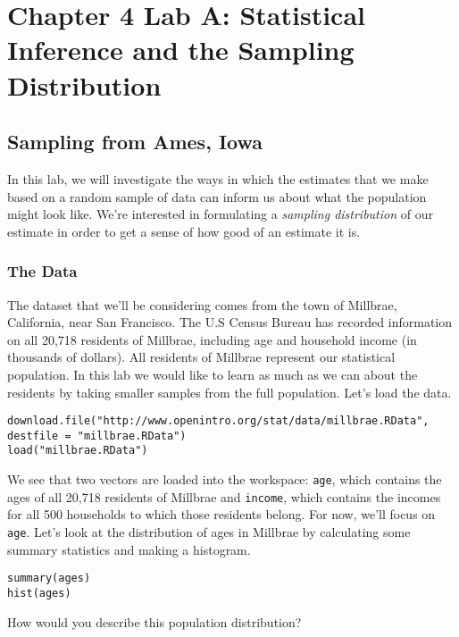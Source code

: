 \documentclass[11pt]{article}
\begin{document}
\section*{Chapter 4 Lab A: Statistical Inference and the Sampling Distribution}
\subsection*{Sampling from Ames, Iowa}

In this lab, we will investigate the ways in which the estimates that we make based on a random sample of data can inform us about what the population might look like.  We're interested in formulating a \emph{sampling distribution} of our estimate in order to get a sense of how good of an estimate it is.

\subsubsection*{The Data}
The dataset that we'll be considering comes from the town of Millbrae, California, near San Francisco.  The U.S Census Bureau has recorded information on all 20,718 residents of Millbrae, including age and household income (in thousands of dollars).  All residents of Millbrae represent our statistical population.  In this lab we would like to learn as much as we can about the residents by taking smaller samples from the full population.  Let's load the data.

\begin{lstlisting}
download.file("http://www.openintro.org/stat/data/millbrae.RData", destfile = "millbrae.RData")
load("millbrae.RData")
\end{lstlisting}

We see that two vectors are loaded into the workspace: \texttt{age}, which contains the ages of all 20,718 residents of Millbrae and \texttt{income}, which contains the incomes for all 500 households to which those residents belong.  For now, we'll focus on \texttt{age}.  Let's look at the distribution of ages in Millbrae by calculating some summary statistics and making a histogram.

\begin{lstlisting}
summary(ages)
hist(ages)
\end{lstlisting}


\begin{exercise}
How would you describe this population distribution?
\end{exercise}
\end{document}
